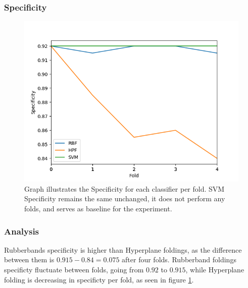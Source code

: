 \documentclass[a4paper,twoside]{bth}
\begin{document}
\subsubsection{Specificity}
\begin{figure}[!htb]
\centering
\includegraphics[scale=0.7]{images/result-liver/Specificity.png}
   \caption{Graph illustrates the Specificity for each classifier per fold. SVM Specificity remains the same unchanged, it does not perform any folds, and serves as baseline for the experiment.}
   \label{fig:liver-Specificty}
\end{figure}

\FloatBarrier

\subsubsection{Analysis}
Rubberbands specificity is higher than Hyperplane foldings, as the difference between them is $0.915 - 0.84 = 0.075$ after four folds. Rubberband foldings specificty fluctuate between folds, going from $0.92$ to $0.915$, while Hyperplane folding is decreasing in specificty per fold, as seen in figure \ref{fig:liver-Specificty}.

\clearpage
\FloatBarrier
\end{document}
